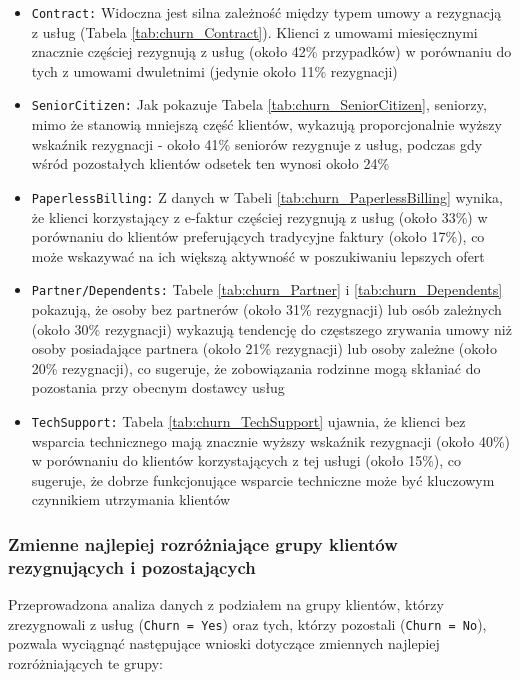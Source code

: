 \documentclass[12pt, a4paper]{article}\usepackage[]{graphicx}\usepackage[]{xcolor}
\begin{document}
\begin{itemize}
  \item \texttt{Contract:} Widoczna jest silna zależność między typem umowy a rezygnacją z usług (Tabela \ref{tab:churn_Contract}). Klienci z umowami miesięcznymi znacznie częściej rezygnują z usług (około 42\% przypadków) w porównaniu do tych z umowami dwuletnimi (jedynie około 11\% rezygnacji)
  
  \item \texttt{SeniorCitizen:} Jak pokazuje Tabela \ref{tab:churn_SeniorCitizen}, seniorzy, mimo że stanowią mniejszą część klientów, wykazują proporcjonalnie wyższy wskaźnik rezygnacji - około 41\% seniorów rezygnuje z usług, podczas gdy wśród pozostałych klientów odsetek ten wynosi około 24\%
  
  \item \texttt{PaperlessBilling:} Z danych w Tabeli \ref{tab:churn_PaperlessBilling} wynika, że klienci korzystający z e-faktur częściej rezygnują z usług (około 33\%) w porównaniu do klientów preferujących tradycyjne faktury (około 17\%), co może wskazywać na ich większą aktywność w poszukiwaniu lepszych ofert
  
  \item \texttt{Partner/Dependents:} Tabele \ref{tab:churn_Partner} i \ref{tab:churn_Dependents} pokazują, że osoby bez partnerów (około 31\% rezygnacji) lub osób zależnych (około 30\% rezygnacji) wykazują tendencję do częstszego zrywania umowy niż osoby posiadające partnera (około 21\% rezygnacji) lub osoby zależne (około 20\% rezygnacji), co sugeruje, że zobowiązania rodzinne mogą skłaniać do pozostania przy obecnym dostawcy usług
  
  \item \texttt{TechSupport:} Tabela \ref{tab:churn_TechSupport} ujawnia, że klienci bez wsparcia technicznego mają znacznie wyższy wskaźnik rezygnacji (około 40\%) w porównaniu do klientów korzystających z tej usługi (około 15\%), co sugeruje, że dobrze funkcjonujące wsparcie techniczne może być kluczowym czynnikiem utrzymania klientów
\end{itemize}


\subsubsection{Zmienne najlepiej rozróżniające grupy klientów rezygnujących i pozostających}

Przeprowadzona analiza danych z podziałem na grupy klientów, którzy zrezygnowali z usług (\texttt{Churn = Yes}) oraz tych, którzy pozostali (\texttt{Churn = No}), pozwala wyciągnąć następujące wnioski dotyczące zmiennych najlepiej rozróżniających te grupy:
\end{document}
